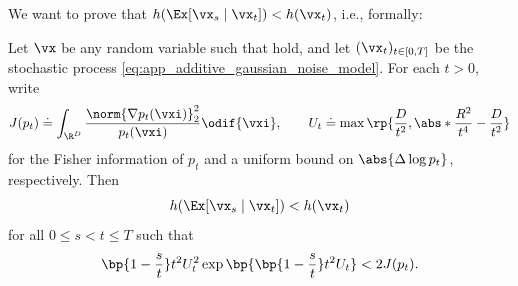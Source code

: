 \documentclass[../../book-main.tex]{subfiles}
\begin{document}
We want to prove that \(h(\Ex[\vx_{s} \mid \vx_{t}]) < h(\vx_{t})\),
i.e., formally:
\begin{theorem}\label{thm:conditioning_reduces_entropy}
    Let \(\vx\) be any random variable such that
    hold, and let \((\vx_{t})_{t \in [0, T]}\) be the stochastic
    process \eqref{eq:app_additive_gaussian_noise_model}. For each
    \(t > 0\), write
    \begin{equation}
        J(p_{t}) \doteq
        \int_{\R^{D}}\frac{\norm{\nabla
        p_{t}(\vxi)}_{2}^{2}}{p_{t}(\vxi)}\odif{\vxi}, \qquad
        U_{t} \doteq \max\rp{\frac{D}{t^{2}},
        \abs*{\frac{R^{2}}{t^{4}} - \frac{D}{t^{2}}}}
    \end{equation}
    for the Fisher information of \(p_{t}\) and a uniform bound
    on \(\abs{\Delta \log p_{t}}\), respectively. Then
    \begin{equation}
        h(\Ex[\vx_{s} \mid \vx_{t}]) < h(\vx_{t})
    \end{equation}
    for all \(0 \leq s < t \leq T\) such that
    \begin{equation}\label{eq:conditioning_entropy_condition}
        \bp{1 - \frac{s}{t}}t^{2}U_{t}^{2}
        \exp\bp{\bp{1 - \frac{s}{t}}t^{2}U_{t}} < 2J(p_{t}).
    \end{equation}
\end{theorem}
\end{document}
